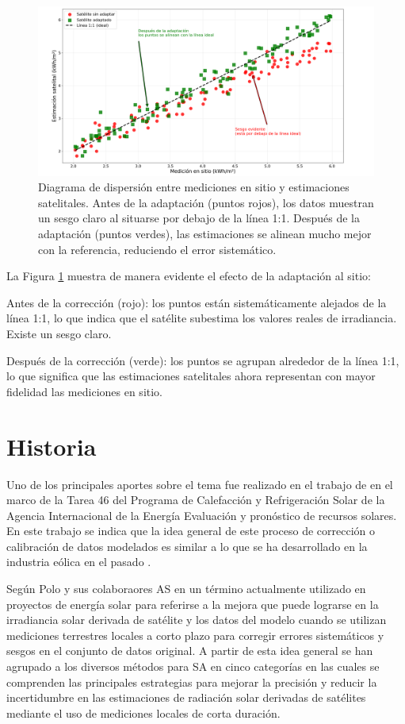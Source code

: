 \begin{figure}[H]
\centering
\includegraphics[width=\textwidth]{figuras/scatter-01.png}
\caption{Diagrama de dispersión entre mediciones en sitio y estimaciones satelitales.
Antes de la adaptación (puntos rojos), los datos muestran un sesgo claro al situarse por debajo de la línea 1:1. 
Después de la adaptación (puntos verdes), las estimaciones se alinean mucho mejor con la referencia, reduciendo el error sistemático.}
\label{fig:scatter01}
\end{figure}



La Figura \ref{fig:scatter01} muestra de manera evidente el efecto de la adaptación al sitio:

Antes de la corrección (rojo): los puntos están sistemáticamente alejados de la línea 1:1, lo que indica que el satélite subestima los valores reales de irradiancia. Existe un sesgo claro.

Después de la corrección (verde): los puntos se agrupan alrededor de la línea 1:1, lo que significa que las estimaciones satelitales ahora representan con mayor fidelidad las mediciones en sitio.




\section{Historia}
Uno de los principales aportes sobre el tema fue realizado en el trabajo de \cite{POLO2016} en el marco de la Tarea 46 del Programa de Calefacción y Refrigeración Solar de la Agencia Internacional de la Energía Evaluación y pronóstico de recursos solares. En este trabajo se indica que la idea general de este proceso de corrección o calibración de datos modelados es similar a lo que se ha desarrollado en  la industria eólica en el pasado \citep{Potter}.
 
Según Polo y sus colaboraores AS en un término actualmente utilizado en proyectos de energía solar para referirse a la mejora que puede lograrse en la irradiancia solar derivada de satélite y los datos del modelo cuando se utilizan mediciones terrestres locales a corto plazo para corregir errores sistemáticos y sesgos en el conjunto de datos original. A partir de esta idea general se han agrupado a los diversos métodos para SA en cinco categorías en las cuales se comprenden las principales estrategias para mejorar la precisión y reducir la incertidumbre en las estimaciones de radiación solar derivadas de satélites mediante el uso de mediciones locales de corta duración.

